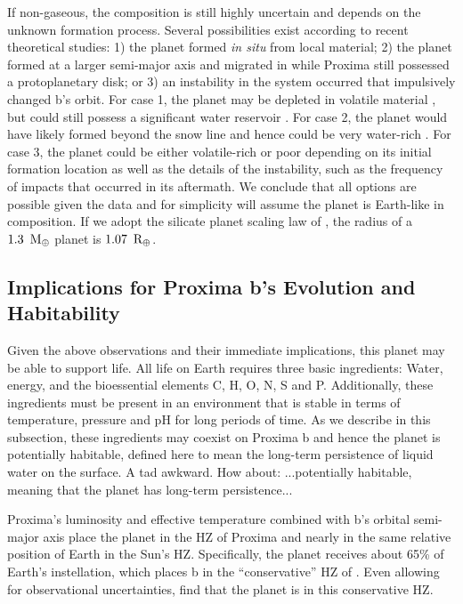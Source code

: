 \documentclass[preprint,12pt]{aastex}
\newcommand{\xxx}[1]{{\color{red} #1}} %
\def\mearth{{\rm\,M_\oplus}}
\def\rearth{{\rm\,R_\oplus}}
\begin{document}
If non-gaseous, the composition is still highly uncertain and depends
on the unknown formation process. Several possibilities exist
according to recent theoretical studies: 1) the planet formed {\it in
  situ} from local material; 2) the planet formed at a larger
semi-major axis and migrated in while Proxima still possessed a
protoplanetary disk; or 3) an instability in the system occurred that
impulsively changed b's orbit. For case 1, the planet may be depleted
in volatile material \citep{Raymond07,Lissauer07}, but could still
possess a significant water reservoir \citep{Ciesla15,Mulders15}. For case 2,
the planet would have likely formed beyond the snow line and hence
could be very water-rich \citep{CarterBond12}. For case 3, the planet
could be either volatile-rich or poor depending on its initial
formation location as well as the details of the instability, such as
the frequency of impacts that occurred in its aftermath. We conclude
that all options are possible given the data and for simplicity will
assume the planet is Earth-like in composition. If we adopt the
silicate planet scaling law of \cite{Sotin07}, the radius of a
$1.3~\mearth$ planet is $1.07~\rearth$.

\subsection{Implications for Proxima b's Evolution and Habitability}
\label{sec:obs:imp}

Given the above observations and their immediate implications, this
planet may be able to support life. All life on Earth requires three
basic ingredients: Water, energy, and the bioessential elements C, H,
O, N, S and P. Additionally, these ingredients must be present in an
environment that is stable in terms of temperature, pressure and pH
for long periods of time. As we describe in this subsection, these
ingredients may coexist on Proxima b and hence the planet is
potentially habitable, defined here to mean the long-term persistence
of liquid water \xxx{on} the surface. \xxx{A tad awkward. How about: ...potentially
habitable, meaning that the planet has long-term persistence...}

Proxima's luminosity and effective temperature combined with b's
orbital semi-major axis place the planet in the HZ of
Proxima and nearly in the same relative position of Earth in the Sun's
HZ. Specifically, the planet receives about 65\% of Earth's
instellation, which places b in the ``conservative'' HZ of 
\cite{Kopparapu13}. Even allowing for observational uncertainties, 
\cite{AngladaEscude16} find that the planet is in this
conservative HZ. 
\end{document}
